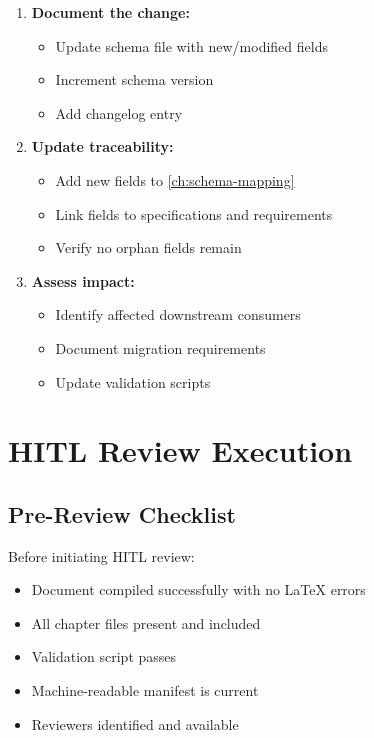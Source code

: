 \begin{enumerate}
  \item \textbf{Document the change:}
        \begin{itemize}[noitemsep]
          \item Update schema file with new/modified fields
          \item Increment schema version
          \item Add changelog entry
        \end{itemize}
        
  \item \textbf{Update traceability:}
        \begin{itemize}[noitemsep]
          \item Add new fields to \cref{ch:schema-mapping}
          \item Link fields to specifications and requirements
          \item Verify no orphan fields remain
        \end{itemize}
        
  \item \textbf{Assess impact:}
        \begin{itemize}[noitemsep]
          \item Identify affected downstream consumers
          \item Document migration requirements
          \item Update validation scripts
        \end{itemize}
\end{enumerate}

\section{HITL Review Execution}
\label{sec:review-execution}

\subsection{Pre-Review Checklist}

Before initiating HITL review:

\begin{itemize}
  \item[$\square$] Document compiled successfully with no LaTeX errors
  \item[$\square$] All chapter files present and included
  \item[$\square$] Validation script passes
  \item[$\square$] Machine-readable manifest is current
  \item[$\square$] Reviewers identified and available
\end{itemize}

